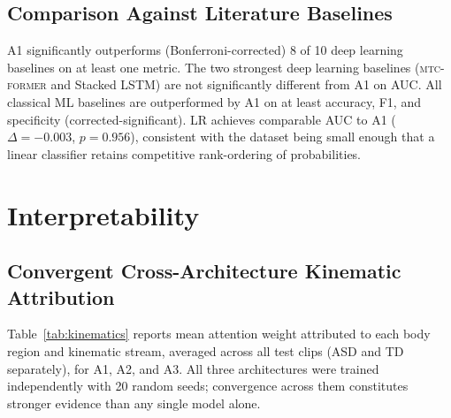 \documentclass[a4paper,fleqn]{cas-sc}
\newcommand{\mtcf}{\textsc{mtc-former}\xspace}
\begin{document}
\subsection{Comparison Against Literature Baselines}
\label{sec:results_baselines}

A1 significantly outperforms (Bonferroni-corrected) 8 of 10 deep learning
baselines on at least one metric.
The two strongest deep learning baselines (\mtcf and Stacked LSTM) are not
significantly different from A1 on AUC.
All classical ML baselines are outperformed by A1 on at least accuracy, F1,
and specificity (corrected-significant).
LR achieves comparable AUC to A1 ($\Delta=-0.003$, $p=0.956$), consistent
with the dataset being small enough that a linear classifier retains competitive
rank-ordering of probabilities.

\section{Interpretability}
\label{sec:interp}

\subsection{Convergent Cross-Architecture Kinematic Attribution}
\label{sec:interp_kinematics}

Table~\ref{tab:kinematics} reports mean attention weight attributed to each
body region and kinematic stream, averaged across all test clips (ASD and TD
separately), for A1, A2, and A3.
All three architectures were trained independently with 20 random seeds;
convergence across them constitutes stronger evidence than any single model alone.
\end{document}
